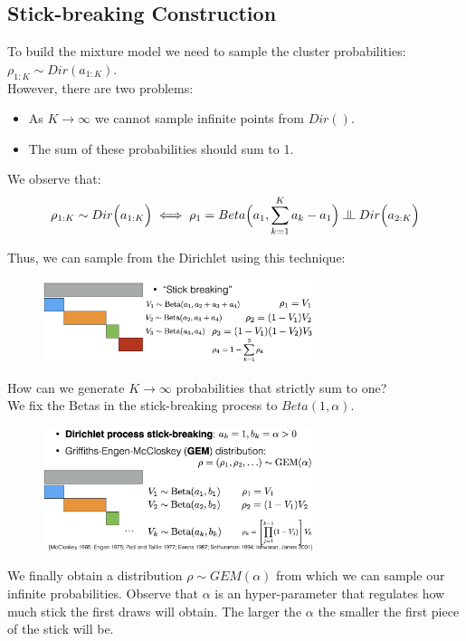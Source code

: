 \documentclass[twoside]{article}
\newcommand{\indep}{\raisebox{0.05em}{\rotatebox[origin=c]{90}{$\models$}}}
\begin{document}
\subsection{Stick-breaking Construction}
To build the mixture model we need to sample the cluster probabilities:  $\rho_{1 : K} \sim Dir(a_{1 :K})$.\\ However, there are two problems:
\begin{itemize}
    \item As $K \to \infty$ we cannot sample infinite points from $Dir()$.
    \item The sum of these probabilities should sum to 1. 
\end{itemize}
We observe that:
$$ \rho_{1:K} \sim Dir\Big(a_{1:K}\Big) \iff
\rho_{1} = Beta\Big(a_{1}, \sum_{k=1}^{K} a_{k} - a_{1} \Big) \; \indep \; Dir\Big(a_{2:K} \Big)
$$

Thus, we can sample from the Dirichlet using this technique:
\begin{figure}[h]
\centering
\includegraphics[width=0.7\textwidth]{img/stick-breaking.png}
\end{figure}

\newpage

How can we generate $K \to \infty$ probabilities that strictly sum to one?\\ 
We fix the Betas in the stick-breaking process to $Beta(1,\alpha)$.

\vspace{1mm}

\begin{figure}[h]
\centering
\includegraphics[width=0.7\textwidth]{img/stick-breaking2.png}
\end{figure}

\vspace{1mm}
We finally obtain a distribution $\rho \sim GEM(\alpha)$ from which we can sample our infinite probabilities.
Observe that $\alpha$ is an hyper-parameter that regulates how much stick the first draws will obtain. The larger the $\alpha$ the smaller the first piece of the stick will be.
\end{document}
